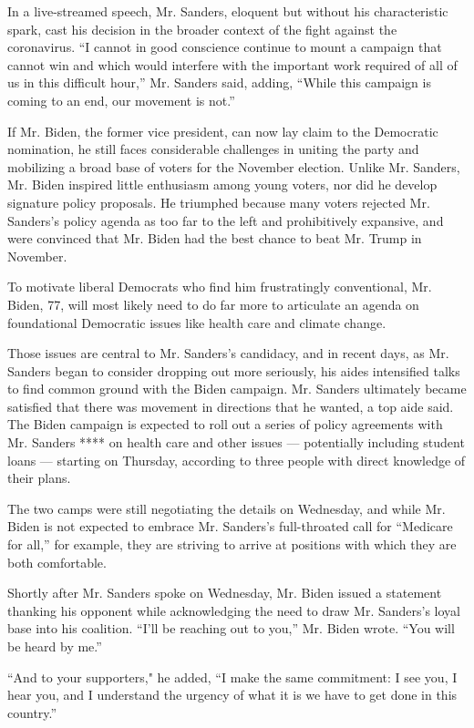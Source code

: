 In a live-streamed speech, Mr. Sanders, eloquent but without his
characteristic spark, cast his decision in the broader context of the
fight against the coronavirus. ``I cannot in good conscience continue to
mount a campaign that cannot win and which would interfere with the
important work required of all of us in this difficult hour,'' Mr.
Sanders said, adding, ``While this campaign is coming to an end, our
movement is not.''

If Mr. Biden, the former vice president, can now lay claim to the
Democratic nomination, he still faces considerable challenges in uniting
the party and mobilizing a broad base of voters for the November
election. Unlike Mr. Sanders, Mr. Biden inspired little enthusiasm among
young voters, nor did he develop signature policy proposals. He
triumphed because many voters rejected Mr. Sanders's policy agenda as
too far to the left and prohibitively expansive, and were convinced that
Mr. Biden had the best chance to beat Mr. Trump in November.

To motivate liberal Democrats who find him frustratingly conventional,
Mr. Biden, 77, will most likely need to do far more to articulate an
agenda on foundational Democratic issues like health care and climate
change.

Those issues are central to Mr. Sanders's candidacy, and in recent days,
as Mr. Sanders began to consider dropping out more seriously, his aides
intensified talks to find common ground with the Biden campaign. Mr.
Sanders ultimately became satisfied that there was movement in
directions that he wanted, a top aide said. The Biden campaign is
expected to roll out a series of policy agreements with Mr. Sanders ****
on health care and other issues --- potentially including student loans
--- starting on Thursday, according to three people with direct
knowledge of their plans.

The two camps were still negotiating the details on Wednesday, and while
Mr. Biden is not expected to embrace Mr. Sanders's full-throated call
for ``Medicare for all,'' for example, they are striving to arrive at
positions with which they are both comfortable.

Shortly after Mr. Sanders spoke on Wednesday, Mr. Biden issued a
statement thanking his opponent while acknowledging the need to draw Mr.
Sanders's loyal base into his coalition. ``I'll be reaching out to
you,'' Mr. Biden wrote. ``You will be heard by me.''

``And to your supporters," he added, ``I make the same commitment: I see
you, I hear you, and I understand the urgency of what it is we have to
get done in this country.''

